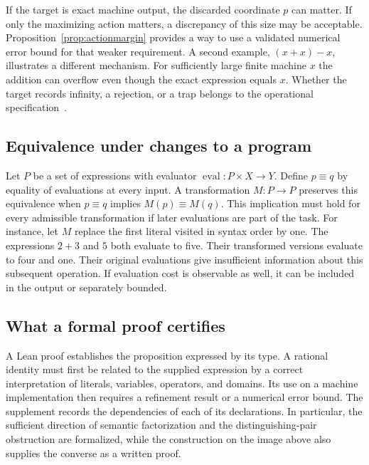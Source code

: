If the target is exact machine output, the discarded coordinate $p$ can matter. If only the maximizing action matters, a discrepancy of this size may be acceptable. Proposition~\ref{prop:actionmargin} provides a way to use a validated numerical error bound for that weaker requirement. A second example, $(x+x)-x$, illustrates a different mechanism. For sufficiently large finite machine $x$ the addition can overflow even though the exact expression equals $x$. Whether the target records infinity, a rejection, or a trap belongs to the operational specification~\cite{goldberg}.

\subsection{Equivalence under changes to a program}
Let $P$ be a set of expressions with evaluator $\operatorname{eval}:P\times X\to Y$. Define $p\equiv q$ by equality of evaluations at every input. A transformation $M:P\to P$ preserves this equivalence when $p\equiv q$ implies $M(p)\equiv M(q)$. This implication must hold for every admissible transformation if later evaluations are part of the task. For instance, let $M$ replace the first literal visited in syntax order by one. The expressions $2+3$ and $5$ both evaluate to five. Their transformed versions evaluate to four and one. Their original evaluations give insufficient information about this subsequent operation. If evaluation cost is observable as well, it can be included in the output or separately bounded.

\subsection{What a formal proof certifies}
A Lean proof establishes the proposition expressed by its type. A rational identity must first be related to the supplied expression by a correct interpretation of literals, variables, operators, and domains. Its use on a machine implementation then requires a refinement result or a numerical error bound. The supplement records the dependencies of each of its declarations. In particular, the sufficient direction of semantic factorization and the distinguishing-pair obstruction are formalized, while the construction on the image above also supplies the converse as a written proof.
